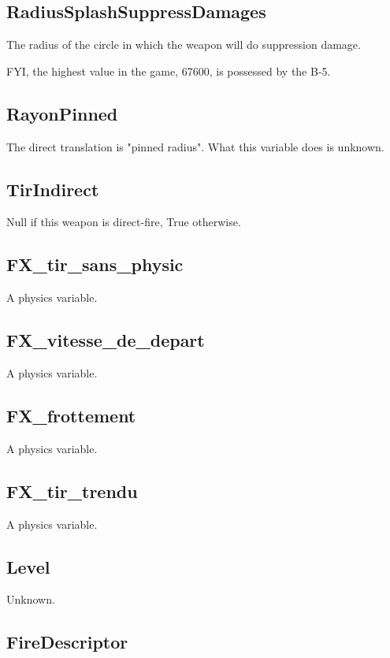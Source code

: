 \documentclass{article}
\begin{document}
\subsection{RadiusSplashSuppressDamages}

The radius of the circle in which the weapon will do suppression damage.

FYI, the highest value in the game, 67600, is possessed by the B-5.

\subsection{RayonPinned}

The direct translation is "pinned radius". What this variable does is unknown.

\subsection{TirIndirect}

Null if this weapon is direct-fire, True otherwise.


\subsection{FX\_tir\_sans\_physic}

A physics variable.

\subsection{FX\_vitesse\_de\_depart}

A physics variable.

\subsection{FX\_frottement}

A physics variable.

\subsection{FX\_tir\_trendu}

A physics variable.

\subsection{Level}

Unknown.

\subsection{FireDescriptor}
\end{document}
